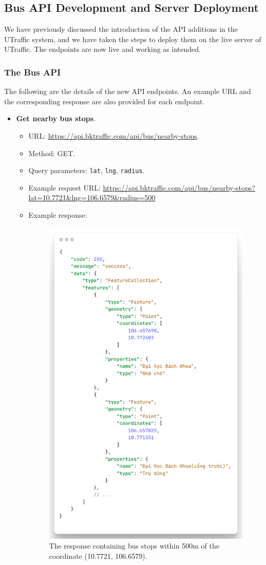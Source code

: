 \subsection{Bus API Development and Server Deployment}
We have previously discussed the introduction of the API additions in the UTraffic system, and we have taken the steps to deploy them on the live server of UTraffic. The endpoints are now live and working as intended.
\subsubsection{The Bus API}
The following are the details of the new API endpoints. An example URL and the corresponding response are also provided for each endpoint.

\begin{itemize}
    
    \item \textbf{Get nearby bus stops}.
    
    \begin{itemize}
        \item URL: \url{https://api.bktraffic.com/api/bus/nearby-stops}.
        \item Method: GET.
        \item Query parameters: \lstinline{lat}, \lstinline{lng}, \lstinline{radius}.
        \item Example request URL: \url{https://api.bktraffic.com/api/bus/nearby-stops?lat=10.7721&lng=106.6579&radius=500}
        \item Example response: 
        \begin{figure}[H]
            \centering
            \includegraphics[width=0.5\linewidth]{assets/images/Implementation/nearby_bus_response.png}
            \caption{The response containing bus stops within 500m of the coordinate (10.7721, 106.6579).}
            \label{fig:nearby_stop_response}
        \end{figure}
    \end{itemize}


\end{itemize}
